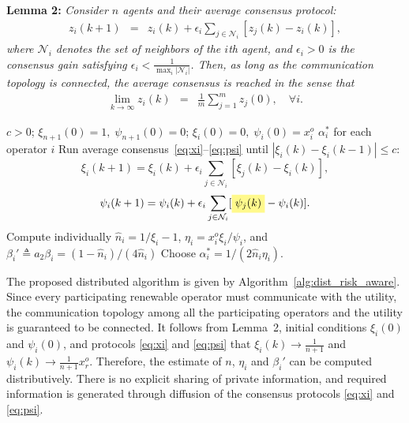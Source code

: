 \documentclass[journal]{IEEEtran}
\begin{document}
\noindent \textbf{Lemma 2:} {\it Consider $n$ agents and their average consensus protocol:
\begin{eqnarray*}
z_i(k+1) & = & z_i(k) + \epsilon_i \sum_{j \in \mathcal{N}_i} [z_j(k) - z_i(k)], \label{eq:consensus} 
\end{eqnarray*}
where $\mathcal{N}_i$ denotes the set of neighbors of the $i$th agent, and $\epsilon_i > 0$ is the consensus gain satisfying $\epsilon_i < \tfrac{1}{\max_i |\mathcal{N}_i|}$. Then, as long as the communication topology is connected, the average consensus is reached in the sense that  
\begin{eqnarray*}
\lim_{k \to \infty} z_i(k) & = & \frac{1}{m}\sum_{j=1}^m z_j(0), \quad \forall i.
\end{eqnarray*}
}

\begin{algorithm}[hbt]
\caption{Distributed Risk-Aware Nash Optimization}
\label{alg:dist_risk_aware}
\begin{algorithmic}[1]
\Require $c>0$;\; $\xi_{n+1}(0)=1,\;\psi_{n+1}(0)=0$;\; $\xi_i(0)=0,\;$\colorbox{yellow!45}{$\psi_i(0)=x_i^o$}
\Ensure $\alpha_i^*$ for each operator $i$
\State Run average consensus~\eqref{eq:xi}--\eqref{eq:psi} until \mbox{$|\xi_i(k)-\xi_i(k-1)|\leq c$}:
\begin{equation}
    \xi_i(k+1) = \xi_i(k) + \epsilon_i \sum_{j \in \mathcal{N}_i} [\xi_j(k) - \xi_i(k)], \label{eq:xi}
\end{equation}
\begin{equation}
\psi_i(k+1) = \psi_i(k) + \epsilon_i \sum_{j \in \mathcal{N}_i} [\text{\colorbox{yellow!45}{$\psi_j(k)$}} - \psi_i(k)]. \label{eq:psi}
\end{equation}
\State Compute individually $\hat{n}_i = 1/\xi_i - 1$, $\eta_i = x_i^o\xi_i/\psi_i$, and $\beta_i' \triangleq a_2\beta_i = (1-\hat{n}_i)/(4\hat{n}_i)$
\State Choose $\alpha_i^* = 1/(2\hat{n}_i\eta_i)$.
\end{algorithmic}
\end{algorithm}

The proposed distributed algorithm is given by Algorithm~\ref{alg:dist_risk_aware}. Since every participating renewable operator must communicate with the utility, the communication topology among all the participating operators and the utility is guaranteed to be connected. It follows from Lemma~2, initial conditions $\xi_i(0)$ and $\psi_i(0)$, and protocols \eqref{eq:xi} and \eqref{eq:psi} that $\xi_i(k)\rightarrow \frac{1}{n+1}$ and $\psi_i(k)\rightarrow \frac{1}{n+1}x_r^o$. Therefore, the estimate of $n$, $\eta_i$ and $\beta_i'$ can be computed distributively. There is no explicit sharing of private information, and required information is generated through diffusion of the consensus protocols \eqref{eq:xi} and \eqref{eq:psi}.
\end{document}
